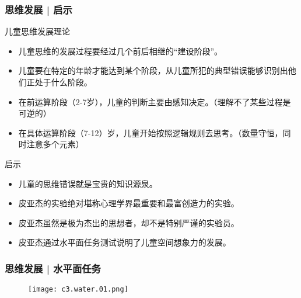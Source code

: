 \begin{frame}
  \frametitle{思维发展 | 启示}
  \begin{block}{儿童思维发展理论}
    \begin{itemize}
      \item 儿童思维的发展过程要经过几个前后相继的“建设阶段”。
      \item 儿童要在特定的年龄才能达到某个阶段，从儿童所犯的典型错误能够识别出他们正处于什么阶段。
      \item 在前运算阶段（2-7岁），儿童的判断主要由感知决定。（理解不了某些过程是可逆的）
      \item 在具体运算阶段（7-12）岁，儿童开始按照逻辑规则去思考。（数量守恒，同时注意多个元素）
    \end{itemize}
  \end{block}
  \pause
  \begin{block}{启示}
    \begin{itemize}
      \item 儿童的思维错误就是宝贵的知识源泉。
      \item 皮亚杰的实验绝对堪称心理学界最重要和最富创造力的实验。
      \item 皮亚杰虽然是极为杰出的思想者，却不是特别严谨的实验员。
      \item 皮亚杰通过水平面任务测试说明了儿童空间想象力的发展。
    \end{itemize}
  \end{block}
\end{frame}

\begin{frame}
  \frametitle{思维发展 | 水平面任务}
  \begin{figure}
    \centering
    \texttt{[image: c3.water.01.png]}
  \end{figure}
\end{frame}

